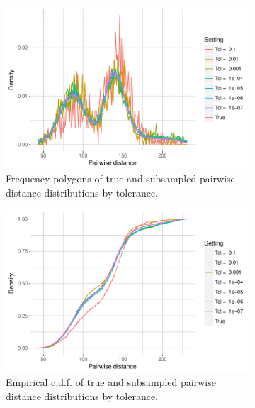 \documentclass{article}
\begin{document}
\begin{figure}
    \begin{subfigure}{.5\textwidth}
        \includegraphics[width=\linewidth]{Figures/PairwiseDistance/freqpoly_by_tol.pdf}
   		\caption{Frequency polygons of true and subsampled pairwise distance distributions by tolerance.}
    	\label{fig:FreqPoly}
    \end{subfigure}
    \begin{subfigure}{.5\textwidth}
        \includegraphics[width=\linewidth]{Figures/PairwiseDistance/ecdf_by_tol.pdf}
    	\caption{Empirical c.d.f. of true and subsampled pairwise distance distributions by tolerance.}
    	\label{fig:ECDF}
    \end{subfigure}
    \begin{subfigure}{.5\textwidth}

\end{subfigure}
\end{figure}
\end{document}
